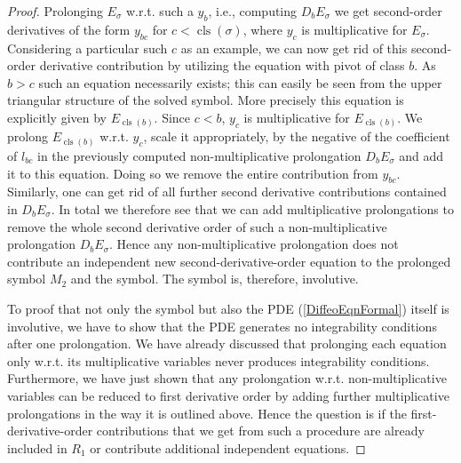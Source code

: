 \begin{proof}
Prolonging $E_{\sigma}$ w.r.t. such a $y_b$, i.e., computing $D_bE_{\sigma}$ we get second-order derivatives of the form $y_{bc}$ for $c < \operatorname{cls}(\sigma)$, where $y_c$ is multiplicative for $E_{\sigma}$. Considering a particular such $c$ as an example, we can now get rid of this second-order derivative contribution by utilizing the equation with pivot of class $b$. As $b>c$ such an equation necessarily exists; this can easily be seen from the upper triangular structure of the solved symbol. More precisely this equation is explicitly given by $E_{\operatorname{cls}(b)}$.
Since $c<b$, $y_c$ is multiplicative for $E_{\operatorname{cls}(b)}$. We prolong $E_{\operatorname{cls}(b)}$ w.r.t. $y_c$, scale it appropriately, by the negative of the coefficient of $l_{bc}$ in the previously computed non-multiplicative prolongation $D_bE_{\sigma}$ and add it to this equation. Doing so we remove the entire contribution from $y_{bc}$. Similarly, one can get rid of all further second derivative contributions contained in $D_bE_{\sigma}$. In total we therefore see that we can add multiplicative prolongations to remove the whole second derivative order of such a non-multiplicative prolongation $D_bE_{\sigma}$.
Hence any non-multiplicative prolongation does not contribute an independent new second-derivative-order equation to the prolonged symbol $M_2$ and the symbol. The symbol is, therefore, involutive. 

To proof that not only the symbol but also the PDE (\ref{DiffeoEqnFormal}) itself is involutive, we have to show that the PDE generates no integrability conditions after one prolongation. We have already discussed that prolonging each equation only w.r.t. its multiplicative variables never produces integrability conditions. Furthermore, we have just shown that any prolongation w.r.t. non-multiplicative variables can be reduced to first derivative order by adding further multiplicative prolongations in the way it is outlined above. Hence the question is if the first-derivative-order contributions that we get from such a procedure are already included in $R_1$ or contribute additional independent equations. 


\end{proof}
